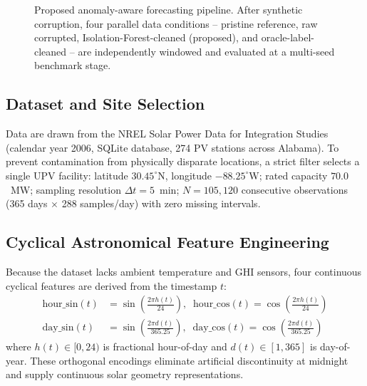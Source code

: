 \documentclass[conference]{IEEEtran}
\begin{document}
\begin{figure}[!t]
{%
}
\caption{Proposed anomaly-aware forecasting pipeline. After synthetic corruption, four parallel data conditions -- pristine reference, raw corrupted, Isolation-Forest-cleaned (proposed), and oracle-label-cleaned -- are independently windowed and evaluated at a multi-seed benchmark stage.}
\label{fig:architecture}
\end{figure}

\subsection{Dataset and Site Selection}
Data are drawn from the NREL Solar Power Data for Integration Studies (calendar year 2006, SQLite database, 274 PV stations across Alabama). To prevent contamination from physically disparate locations, a strict filter selects a single UPV facility: latitude $30.45^\circ$N, longitude $-88.25^\circ$W; rated capacity $70.0$~MW; sampling resolution $\Delta t = 5$~min; $N = 105{,}120$ consecutive observations (365 days $\times$ 288 samples/day) with zero missing intervals.

\subsection{Cyclical Astronomical Feature Engineering}
Because the dataset lacks ambient temperature and GHI sensors, four continuous cyclical features are derived from the timestamp $t$:
\begin{align}
\text{hour\_sin}(t) &= \sin\!\left(\frac{2\pi h(t)}{24}\right), \;\;
\text{hour\_cos}(t) = \cos\!\left(\frac{2\pi h(t)}{24}\right) \\
\text{day\_sin}(t) &= \sin\!\left(\frac{2\pi d(t)}{365.25}\right), \;\;
\text{day\_cos}(t) = \cos\!\left(\frac{2\pi d(t)}{365.25}\right)
\end{align}
where $h(t) \in [0, 24)$ is fractional hour-of-day and $d(t) \in [1, 365]$ is day-of-year. These orthogonal encodings eliminate artificial discontinuity at midnight and supply continuous solar geometry representations.
\end{document}
